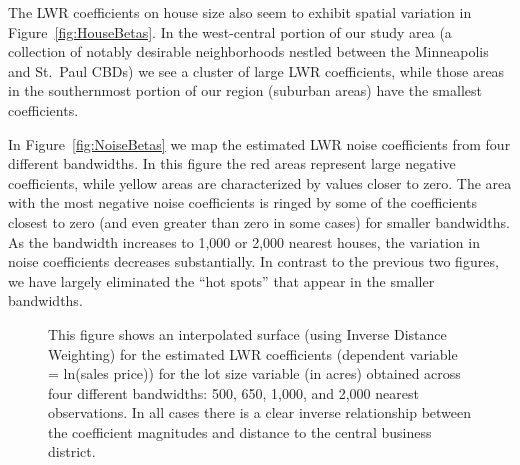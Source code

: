 \documentclass[leqno]{article}\usepackage[]{graphicx}\usepackage[]{color}
\begin{document}
The LWR coefficients on house size also seem to exhibit spatial variation in Figure~\ref{fig:HouseBetas}. In the west-central portion of our study area (a collection of notably desirable neighborhoods nestled between the Minneapolis and St.\ Paul CBDs) we see a cluster of large LWR coefficients, while those areas in the southernmost portion of our region (suburban areas) have the smallest coefficients. 

In Figure~\ref{fig:NoiseBetas} we map the estimated LWR noise coefficients from four different bandwidths. In this figure the red areas represent large negative coefficients, while yellow areas are characterized by values closer to zero. The area with the most negative noise coefficients is ringed by some of the coefficients closest to zero (and even greater than zero in some cases) for smaller bandwidths. As the bandwidth increases to 1,000 or 2,000 nearest houses, the variation in noise coefficients decreases substantially. In contrast to the previous two figures, we have largely eliminated the ``hot spots'' that appear in the smaller bandwidths. 


\begin{figure}
 \caption{This figure shows an interpolated surface (using Inverse Distance Weighting) for the estimated LWR coefficients (dependent variable = ln(sales price)) for the lot size variable (in acres) obtained across four different bandwidths: 500, 650, 1,000, and 2,000 nearest observations. In all cases there is a clear inverse relationship between the coefficient magnitudes and distance to the central business district.}
 \label{fig:AcreBetas}
\end{figure}
\end{document}
